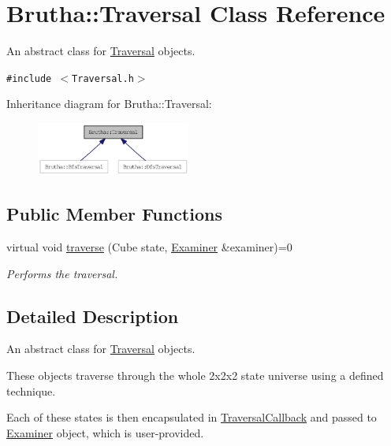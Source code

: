 \hypertarget{classBrutha_1_1Traversal}{
\section{Brutha::Traversal Class Reference}
\label{classBrutha_1_1Traversal}
}
An abstract class for \hyperlink{classBrutha_1_1Traversal}{Traversal} objects.  


{\tt \#include $<$Traversal.h$>$}

Inheritance diagram for Brutha::Traversal:\nopagebreak
\begin{figure}[H]
\begin{center}
\leavevmode
\includegraphics[width=143pt]{classBrutha_1_1Traversal__inherit__graph}
\end{center}
\end{figure}
\subsection*{Public Member Functions}
\begin{CompactItemize}
\item 
virtual void \hyperlink{classBrutha_1_1Traversal_67ab6c006a71670a85bf44e402929d01}{traverse} (Cube state, \hyperlink{classBrutha_1_1Examiner}{Examiner} \&examiner)=0
\begin{CompactList}\small\item\em Performs the traversal. \item\end{CompactList}\end{CompactItemize}


\subsection{Detailed Description}
An abstract class for \hyperlink{classBrutha_1_1Traversal}{Traversal} objects. 

These objects traverse through the whole 2x2x2 state universe using a defined technique.

Each of these states is then encapsulated in \hyperlink{classBrutha_1_1TraversalCallback}{TraversalCallback} and passed to \hyperlink{classBrutha_1_1Examiner}{Examiner} object, which is user-provided.

